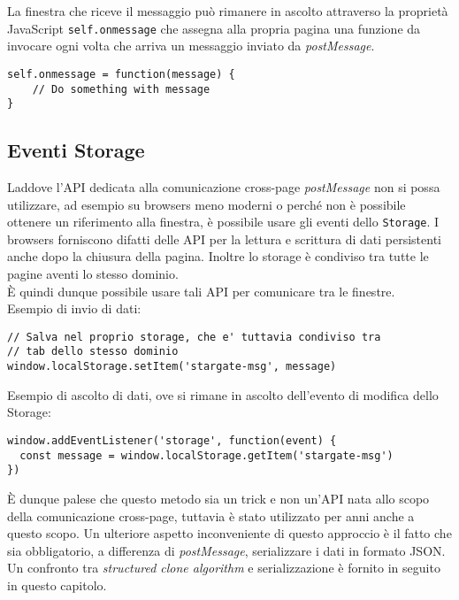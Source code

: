 La finestra che riceve il messaggio può rimanere in ascolto attraverso la proprietà JavaScript \texttt{self.onmessage} che assegna alla propria pagina una funzione da invocare ogni volta che arriva un messaggio inviato da \textit{postMessage}.

\begin{lstlisting}
self.onmessage = function(message) {
    // Do something with message
}
\end{lstlisting}

\subsection{Eventi Storage}

Laddove l'API dedicata alla comunicazione cross-page \textit{postMessage} non si possa utilizzare, ad esempio su browsers meno moderni o perché non è possibile ottenere un riferimento alla finestra, è possibile usare gli eventi dello \texttt{Storage}. I browsers forniscono difatti delle API per la lettura e scrittura di dati persistenti anche dopo la chiusura della pagina. Inoltre lo storage è condiviso tra tutte le pagine aventi lo stesso dominio. \\

È quindi dunque possibile usare tali API per comunicare tra le finestre. \\

Esempio di invio di dati:

\begin{lstlisting}
// Salva nel proprio storage, che e' tuttavia condiviso tra 
// tab dello stesso dominio
window.localStorage.setItem('stargate-msg', message)
\end{lstlisting}

Esempio di ascolto di dati, ove si rimane in ascolto dell'evento di modifica dello Storage:

\begin{lstlisting}
window.addEventListener('storage', function(event) {
  const message = window.localStorage.getItem('stargate-msg')
})
\end{lstlisting}

È dunque palese che questo metodo sia un trick e non un'API nata allo scopo della comunicazione cross-page, tuttavia è stato utilizzato per anni anche a questo scopo. Un ulteriore aspetto inconveniente di questo approccio è il fatto che sia obbligatorio, a differenza di \textit{postMessage}, serializzare i dati in formato \gls{JSON}. Un confronto tra \textit{structured clone algorithm} e serializzazione è fornito in seguito in questo capitolo.

